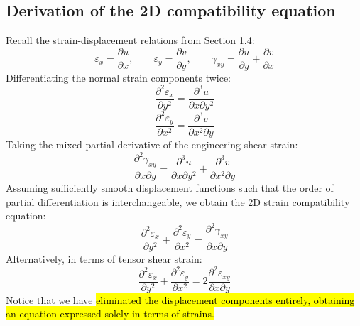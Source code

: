 ﻿\documentclass[12pt]{article}
\begin{document}
\subsection*{Derivation of the 2D compatibility equation}
Recall the strain-displacement relations from Section 1.4:
\[
\varepsilon_x=\frac{\partial u}{\partial x},\qquad
\varepsilon_y=\frac{\partial v}{\partial y},\qquad
\gamma_{xy}=\frac{\partial u}{\partial y}+\frac{\partial v}{\partial x}
\]
Differentiating the normal strain components twice:
\[
\frac{\partial^2\varepsilon_x}{\partial y^2}
=\frac{\partial^3u}{\partial x\partial y^2}
\]
\[
\frac{\partial^2\varepsilon_y}{\partial x^2}
=\frac{\partial^3v}{\partial x^2\partial y}
\]
Taking the mixed partial derivative of the engineering shear strain:
\[
\frac{\partial^2\gamma_{xy}}{\partial x\partial y}
=\frac{\partial^3u}{\partial x\partial y^2}
+\frac{\partial^3v}{\partial x^2\partial y}
\]
Assuming sufficiently smooth displacement functions such that the order of partial differentiation is interchangeable, we obtain the 2D strain compatibility equation:
\[
\boxed{
\frac{\partial^2\varepsilon_x}{\partial y^2}
+\frac{\partial^2\varepsilon_y}{\partial x^2}
=\frac{\partial^2\gamma_{xy}}{\partial x\partial y}
}
\]
Alternatively, in terms of tensor shear strain:
\[
\boxed{
\frac{\partial^2\varepsilon_x}{\partial y^2}
+\frac{\partial^2\varepsilon_y}{\partial x^2}
=2\frac{\partial^2\varepsilon_{xy}}{\partial x\partial y}
}
\]
Notice that we have \hl{eliminated the displacement components entirely, obtaining an equation expressed solely in terms of strains.}
\end{document}

